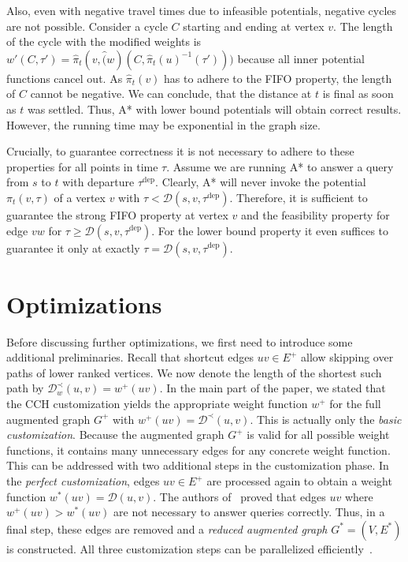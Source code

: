 \documentclass[a4paper,UKenglish,cleveref, autoref, thm-restate,anonymous]{lipics-v2021}
\newcommand*{\dist}{\mathcal{D}}
\newcommand*{\tdep}{\tau^{\operatorname{dep}}}
\begin{document}
Also, even with negative travel times due to infeasible potentials, negative cycles are not possible.
Consider a cycle $C$ starting and ending at vertex $v$.
The length of the cycle with the modified weights is $w'(C, \tau') = \hat{\pi}_t(v, \hat(w)(C, \hat{\pi}_t(u)^{-1}(\tau')))$ because all inner potential functions cancel out.
As $\hat{\pi}_t(v)$ has to adhere to the FIFO property, the length of $C$ cannot be negative.
We can conclude, that the distance at $t$ is final as soon as $t$ was settled.
Thus, A* with lower bound potentials will obtain correct results.
However, the running time may be exponential in the graph size.

Crucially, to guarantee correctness it is not necessary to adhere to these properties for all points in time $\tau$.
Assume we are running A* to answer a query from $s$ to $t$ with departure $\tdep$.
Clearly, A* will never invoke the potential $\pi_t(v, \tau)$ of a vertex $v$ with $\tau < \dist(s,v,\tdep)$.
Therefore, it is sufficient to guarantee the strong FIFO property at vertex $v$ and the feasibility property for edge $vw$ for $\tau \geq \dist(s,v,\tdep)$.
For the lower bound property it even suffices to guarantee it only at exactly $\tau = \dist(s,v,\tdep)$.

\section{Optimizations}\label{sec:appendix:optimizations}

Before discussing further optimizations, we first need to introduce some additional preliminaries.
Recall that shortcut edges $uv \in E^+$ allow skipping over paths of lower ranked vertices.
We now denote the length of the shortest such path by $\dist^{\prec}_w(u,v) = w^+(uv)$.
In the main part of the paper, we stated that the CCH customization yields the appropriate weight function $w^+$ for the full augmented graph $G^+$ with $w^+(uv) = \dist^{\prec}(u,v)$.
This is actually only the \emph{basic customization}.
Because the augmented graph $G^+$ is valid for all possible weight functions, it contains many unnecessary edges for any concrete weight function.
This can be addressed with two additional steps in the customization phase.
In the \emph{perfect customization}, edges $uv \in E^+$ are processed again to obtain a weight function $w^*(uv) = \dist(u,v)$.
The authors of~\cite{dsw-cch-15} proved that edges $uv$ where $w^+(uv) > w^*(uv)$ are not necessary to answer queries correctly.
Thus, in a final step, these edges are removed and a \emph{reduced augmented graph} $G^*=(V, E^*)$ is constructed.
All three customization steps can be parallelized efficiently~\cite{bsw-rttau-19}.
\end{document}
